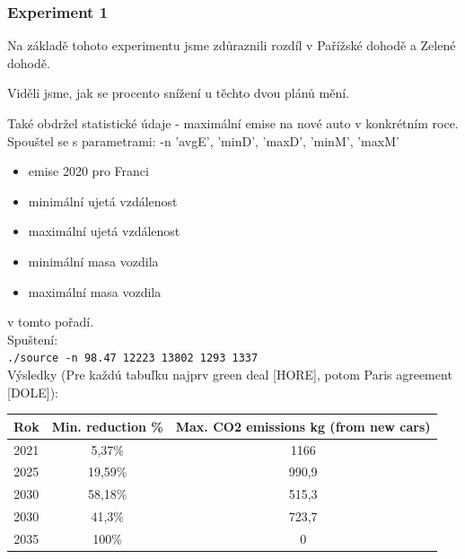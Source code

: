 \documentclass[a4paper, 11pt]{article}
\begin{document}
	\subsubsection{Experiment 1}
	
    Na základě tohoto experimentu jsme zdůraznili rozdíl v Pařížské dohodě a Zelené dohodě. 
    
    Viděli jsme, jak se procento snížení u těchto dvou plánů mění.
    
    Také obdržel statistické údaje - maximální emise na nové auto v konkrétním roce. \\ 
    
	Spouštel se s parametrami: -n 'avgE', 'minD', 'maxD', 'minM', 'maxM'
	
	    \begin{itemize}
            \item emise 2020 pro Franci
            \item minimální ujetá vzdálenost
            \item maximální ujetá vzdálenost
            \item minimální masa vozdila
            \item maximální masa vozdila
        \end{itemize}
    v tomto pořadí. \\
    
	Spuštení: \\
	
	\texttt{./source -n 98.47 12223 13802 1293 1337} \\
	
	Výsledky (Pre každú tabuľku najprv green deal [HORE], potom Paris agreement [DOLE]):
	
	\begin{center}
        \begin{tabular}{|c|c|c|}
        \hline
         Rok & Min. reduction \% & Max. CO2 emissions kg (from new cars) \\ 
         \hline
         2021 & 5,37\% & 1166 \\  
         \hline
         2025 & 19,59\% & 990,9 \\
         \hline
         2030 & 58,18\% & 515,3 \\  
         \hline\hline
         2030 & 41,3\% & 723,7 \\  
         \hline
         2035 & 100\% & 0 \\
         \hline
        \end{tabular}
    \end{center}
    
\end{document}

